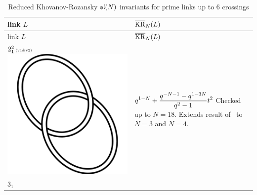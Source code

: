 \documentclass{compositio}
\theoremstyle{definition}
\numberwithin{equation}{section}
\begin{document}
{\footnotesize 
\begin{longtable}{p{}|p{}} 
\caption{Reduced Khovanov-Rozansky $\mathfrak{sl}(N)$ invariants for prime links up to 6 crossings} \\
\label{reducedKR}
link $L$ & $\overline{\operatorname{KR}}_{N}(L)$ \\
\hline\hline
\endfirsthead
link $L$ & $\overline{\operatorname{KR}}_{N}(L)$ \\
\hline\hline
\endhead
\hline\hline
\endfoot
$2_{1}^2\,\text{{\tiny (v1\&v2)}}$ 
\includegraphics[scale=0.07,angle=0]{link2_1_2.pdf} 
& 
\newline
$
\displaystyle{%
q^{1-N} + \frac{q^{-N-1}-q^{1-3 N}}{q^2-1} t^2
}
$
\newline\newline\newline
Checked up to $N=18$. Extends result of~\cite{r0508510} to $N=3$ and $N=4$. 
\\
\hline
$3_{1}$ 

\end{longtable}}
\end{document}

